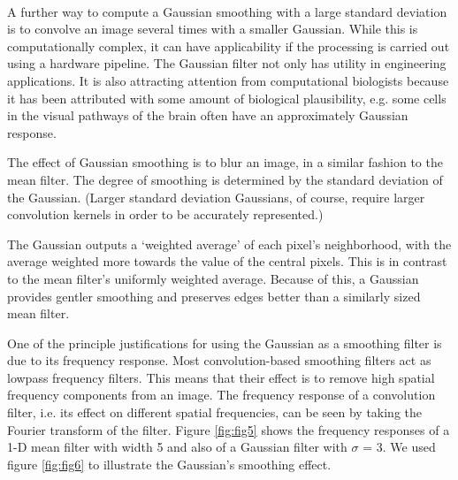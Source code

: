 \documentclass[12pt,fleqn]{book} %
\begin{document}
\begin{figure}[h]
\begin{dBox}
\centering
  \mbox{
   }
   \caption{ \label{fig:fig4} }   
\end{dBox}   
\end{figure}


\bigskip
A further way to compute a Gaussian smoothing with a large 
standard deviation is to convolve an image several times with a 
smaller Gaussian. While this is computationally complex, it can have applicability if the processing 
is carried out using a hardware pipeline. 
\bigskip
The Gaussian filter not only has utility in engineering applications. It is also attracting attention 
from computational biologists because it has been attributed with some amount of biological 
plausibility, e.g. some cells in the visual pathways of the brain often have an approximately 
Gaussian response.

\bigskip
The effect of Gaussian smoothing is to blur an image, in a similar fashion to the mean filter. The 
degree of smoothing is determined by the standard deviation of the Gaussian. (Larger standard 
deviation Gaussians, of course, require larger convolution kernels in order to be accurately 
represented.) 

\bigskip
The Gaussian outputs a `weighted average' of each pixel's neighborhood, with the average 
weighted more towards the value of the central pixels. This is in contrast to the mean filter's 
uniformly weighted average. Because of this, a Gaussian provides gentler smoothing and 
preserves edges better than a similarly sized mean filter. 
\bigskip

One of the principle justifications for using 
the Gaussian as a smoothing filter is due 
to its frequency response. Most 
convolution-based smoothing filters act as 
lowpass frequency filters. This means that 
their effect is to remove high spatial 
frequency components from an image. The 
frequency response of a convolution 
filter, i.e. its effect on different spatial 
frequencies, can be seen by taking the 
Fourier transform of the filter. Figure \ref{fig:fig5}
shows the frequency responses of a 1-D mean filter with width 5 and also of a Gaussian filter 
with $\sigma$ = 3. We used figure \ref{fig:fig6} to illustrate the Gaussian’s smoothing effect.
\end{document}
